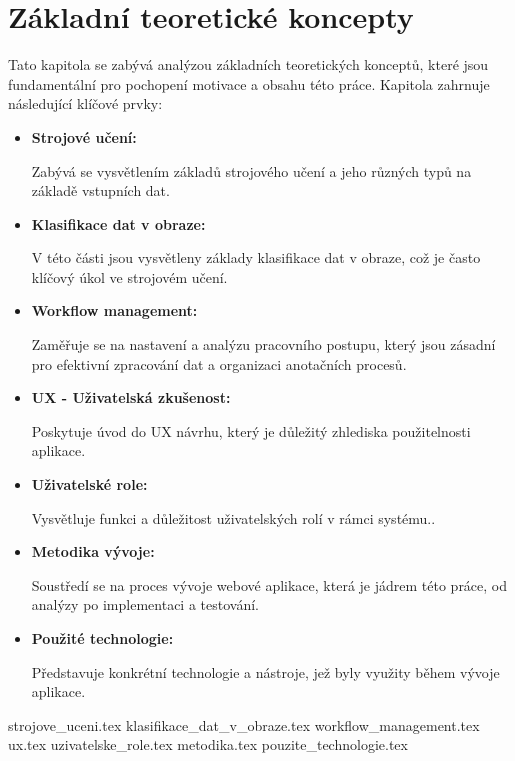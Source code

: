 \chapter{Základní teoretické koncepty}

Tato kapitola se zabývá analýzou základních teoretických konceptů, které jsou fundamentální pro pochopení motivace a obsahu této práce. Kapitola zahrnuje následující klíčové prvky:

\begin{itemize}
  \item \textbf{Strojové učení:}
  
  Zabývá se vysvětlením základů strojového učení a jeho různých typů na základě vstupních dat.

  \item \textbf{Klasifikace dat v obraze:}
  
  V této části jsou vysvětleny základy klasifikace dat v obraze, což je často klíčový úkol ve strojovém učení.

  \item \textbf{Workflow management:}
  
  Zaměřuje se na nastavení a analýzu pracovního postupu, který jsou zásadní pro efektivní zpracování dat a organizaci anotačních procesů.

  \item \textbf{UX - Uživatelská zkušenost:}
  
  Poskytuje úvod do UX návrhu, který je důležitý zhlediska použitelnosti aplikace.
    
  \item \textbf{Uživatelské role:}
  
  Vysvětluje funkci a důležitost uživatelských rolí v rámci systému..

  \item \textbf{Metodika vývoje:}
  
  Soustředí se na proces vývoje webové aplikace, která je jádrem této práce, od analýzy po implementaci a testování.

  \item \textbf{Použité technologie:}
  
  Představuje konkrétní technologie a nástroje, jež byly využity během vývoje aplikace.
\end{itemize}

{strojove_uceni.tex}
{klasifikace_dat_v_obraze.tex}
{workflow_management.tex}
{ux.tex}
{uzivatelske_role.tex}
{metodika.tex}
{pouzite_technologie.tex}
